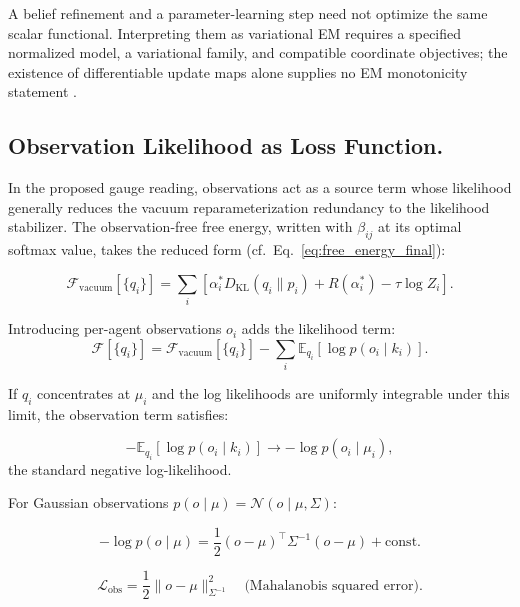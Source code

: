 \documentclass[twoside,11pt]{article}
\begin{document}
A belief refinement and a parameter-learning step need not optimize the same scalar functional. Interpreting them as variational EM requires a specified normalized model, a variational family, and compatible coordinate objectives; the existence of differentiable update maps alone supplies no EM monotonicity statement \citep{Dempster1977,Neal1998}.

\subsection{Observation Likelihood as Loss Function.}

In the proposed gauge reading, observations act as a source term whose likelihood generally reduces the vacuum reparameterization redundancy to the likelihood stabilizer. The observation-free free energy, written with $\beta_{ij}$ at its optimal softmax value, takes the reduced form (cf.\ Eq.~\ref{eq:free_energy_final}):

\begin{equation}
\mathcal{F}_{\text{vacuum}}[\{q_i\}]
=\sum_i\left[\alpha_i^*D_{\mathrm{KL}}(q_i\|p_i)+R(\alpha_i^*)-\tau\log Z_i\right].
\end{equation}

Introducing per-agent observations $o_i$ adds the likelihood term:
\begin{equation}
\mathcal{F}[\{q_i\}] = \mathcal{F}_{\text{vacuum}}[\{q_i\}] - \sum_i \mathbb{E}_{q_i}[\log p(o_i \mid k_i)].
\end{equation}

If $q_i$ concentrates at $\mu_i$ and the log likelihoods are uniformly integrable under this limit, the observation term satisfies:

\begin{equation}
-\mathbb{E}_{q_i}[\log p(o_i \mid k_i)] \to -\log p(o_i \mid \mu_i),
\end{equation}
the standard negative log-likelihood.

For Gaussian observations $p(o \mid \mu) = \mathcal{N}(o \mid \mu, \Sigma)$:

\begin{equation}
-\log p(o \mid \mu) = \frac{1}{2}(o - \mu)^\top \Sigma^{-1} (o - \mu) + \text{const.}
\end{equation}

\begin{equation}
\mathcal{L}_{\text{obs}}
=\frac{1}{2}\|o-\mu\|^2_{\Sigma^{-1}}
\quad\text{(Mahalanobis squared error)}.
\end{equation}
\end{document}
